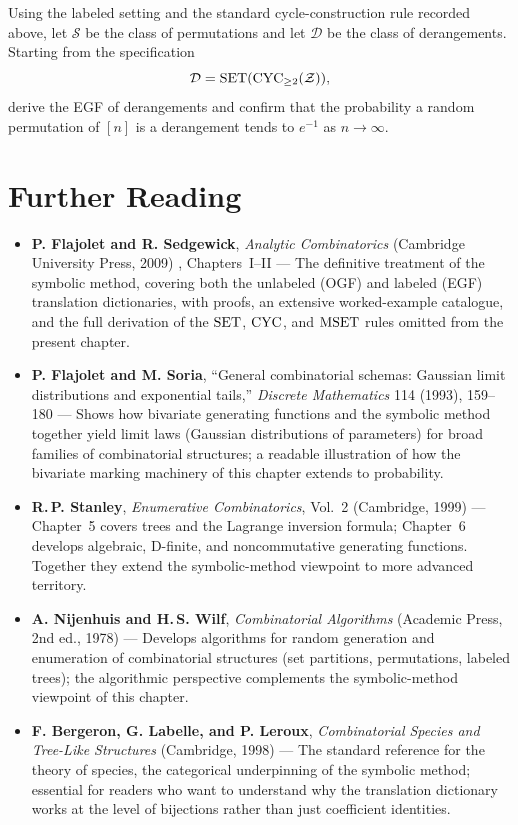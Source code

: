 \begin{exercise}[Challenge]
Using the labeled setting and the standard cycle-construction rule recorded above, let $\mathcal{S}$ be the class of permutations and let $\mathcal{D}$ be the class of derangements. Starting from the specification
\[
  \mathcal{D} = \operatorname{SET}(\operatorname{CYC}_{\ge 2}(\mathcal{Z})),
\]
derive the EGF of derangements and confirm that the probability a random permutation of $[n]$ is a derangement tends to $e^{-1}$ as $n \to \infty$.
\end{exercise}

\section*{Further Reading}

\begin{itemize}
  \item \textbf{P. Flajolet and R. Sedgewick}, \emph{Analytic Combinatorics} (Cambridge University Press, 2009) \cite{FlajoletSedgewick2009}, Chapters~I--II --- The definitive treatment of the symbolic method, covering both the unlabeled (OGF) and labeled (EGF) translation dictionaries, with proofs, an extensive worked-example catalogue, and the full derivation of the $\operatorname{SET}$, $\operatorname{CYC}$, and $\operatorname{MSET}$ rules omitted from the present chapter.

  \item \textbf{P. Flajolet and M. Soria}, ``General combinatorial schemas: Gaussian limit distributions and exponential tails,'' \emph{Discrete Mathematics} 114 (1993), 159--180 --- Shows how bivariate generating functions and the symbolic method together yield limit laws (Gaussian distributions of parameters) for broad families of combinatorial structures; a readable illustration of how the bivariate marking machinery of this chapter extends to probability.

  \item \textbf{R.\,P. Stanley}, \emph{Enumerative Combinatorics}, Vol.~2 (Cambridge, 1999) --- Chapter~5 covers trees and the Lagrange inversion formula; Chapter~6 develops algebraic, D-finite, and noncommutative generating functions. Together they extend the symbolic-method viewpoint to more advanced territory.

  \item \textbf{A. Nijenhuis and H.\,S. Wilf}, \emph{Combinatorial Algorithms} (Academic Press, 2nd ed., 1978) \cite{NijenhuisWilf1978} --- Develops algorithms for random generation and enumeration of combinatorial structures (set partitions, permutations, labeled trees); the algorithmic perspective complements the symbolic-method viewpoint of this chapter.

  \item \textbf{F. Bergeron, G. Labelle, and P. Leroux}, \emph{Combinatorial Species and Tree-Like Structures} (Cambridge, 1998) --- The standard reference for the theory of species, the categorical underpinning of the symbolic method; essential for readers who want to understand why the translation dictionary works at the level of bijections rather than just coefficient identities.
\end{itemize}

